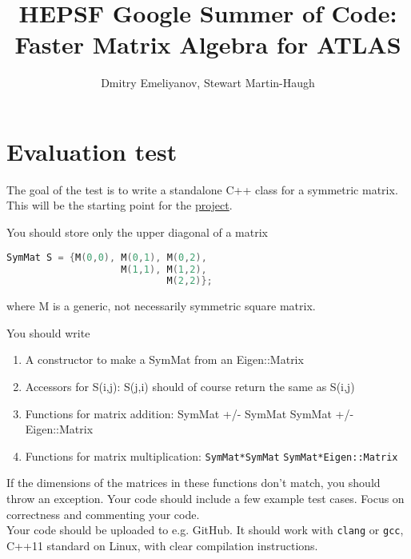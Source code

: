 \documentclass[12pt,a4paper]{article}
\title{HEPSF Google Summer of Code: Faster Matrix Algebra for ATLAS}
\author{Dmitry Emeliyanov, Stewart Martin-Haugh}
\affil{STFC Rutherford Appleton Laboratory}
\begin{document}
\maketitle
\section*{Evaluation test}

The goal of the test is to write a standalone C++ class for a symmetric matrix. This will be the starting point for the \href{http://hepsoftwarefoundation.org/gsoc/2018/proposal\_ATLASEigen.html}{project}.

You should store only the upper diagonal of a matrix

\begin{lstlisting}[language=c++]
SymMat S = {M(0,0), M(0,1), M(0,2),
                    M(1,1), M(1,2),
                            M(2,2)};
\end{lstlisting}

where M is a generic, not necessarily symmetric square matrix.

You should write
\begin{enumerate}
\item A constructor to make a SymMat from an Eigen::Matrix

\item Accessors for S(i,j): S(j,i) should of course return the same as S(i,j)

\item Functions for matrix addition:
\subitem SymMat +/- SymMat
\subitem SymMat +/- Eigen::Matrix

\item Functions for matrix multiplication:
\subitem \lstinline{SymMat*SymMat}
\subitem \lstinline{SymMat*Eigen::Matrix}
\end{enumerate}
If the dimensions of the matrices in these functions don't match, you should throw an exception.
Your code should include a few example test cases. Focus on correctness and commenting your code. \\
 
Your code should be uploaded to e.g. GitHub. It should work with
\lstinline{clang} or \lstinline{gcc}, C++11 standard on Linux, with clear
compilation instructions.
\end{document}
